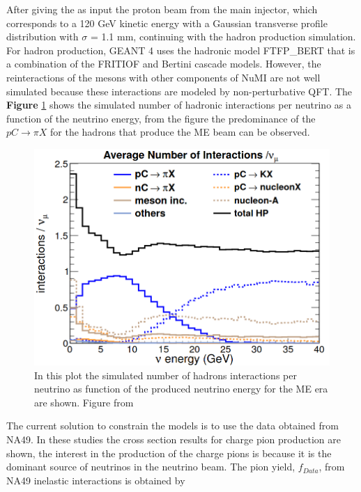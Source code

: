 After giving the as input the proton beam from the main injector, which corresponds to a 120 GeV kinetic energy with a Gaussian transverse profile distribution with $\sigma$ = 1.1 mm, continuing with the hadron production simulation. For hadron production, GEANT 4 uses the hadronic model FTFP\_BERT that is a combination of the FRITIOF \cite{PhysRevD.90.032001} and Bertini \cite{BERTINI1971670} \cite{GUTHRIE196829}cascade models. However, the reinteractions of the mesons with other components of NuMI are not well simulated because these interactions are modeled by non-perturbative QFT. The \textbf{Figure} \ref{fig:Simulation:Beam:HadIntperNu} shows the simulated number of hadronic interactions per neutrino as a function of the neutrino energy, from the figure the predominance of the $pC\rightarrow\pi X$ for the hadrons that produce the ME beam can be observed. 

\begin{figure}[!htb]
    \centering
    \includegraphics[scale=0.3]{Figures/Chapter3/HadronicInteractions.png}
    \caption{In this plot the simulated number of hadrons interactions per neutrino as function of the produced neutrino energy for the ME era are shown. Figure from \cite{LeoThesis}}
    \label{fig:Simulation:Beam:HadIntperNu}
\end{figure}

The current solution to constrain the models is to use the data obtained from NA49\cite{NA49}. In these studies \cite{NA49} the cross section results for charge pion production are shown, the interest in the production of the charge pions is because it is the dominant source of neutrinos in the neutrino beam. The pion yield, $f_{Data}$, from NA49 inelastic interactions is obtained by

